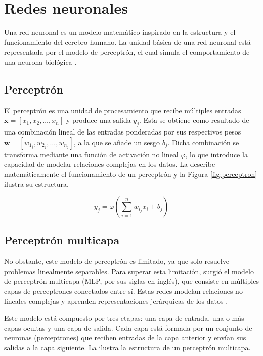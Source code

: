 \section{Redes neuronales}
\label{sec:redes_neuronales}

Una red neuronal es un modelo matemático inspirado en la estructura y el funcionamiento del cerebro humano. La unidad básica de una red neuronal está representada por el modelo de perceptrón, el cual simula el comportamiento de una neurona biológica \cite{rosenblatt1958perceptron}.

\subsection{Perceptrón}
\label{sec:perceptron}

El perceptrón es una unidad de procesamiento que recibe múltiples entradas $\mathbf{x} = [x_1, x_2, \ldots, x_n]$ y produce una salida $y_j$. Esta se obtiene como resultado de una combinación lineal de las entradas ponderadas por sus respectivos pesos $\mathbf{w} = [w_{1_j}, w_{2_j}, \ldots, w_{n_j}]$, a la que se añade un sesgo $b_j$. Dicha combinación se transforma mediante una función de activación no lineal $\varphi$, lo que introduce la capacidad de modelar relaciones complejas en los datos. La  describe matemáticamente el funcionamiento de un perceptrón y la Figura \ref{fig:perceptron} ilustra su estructura.

\begin{equation}
    \label{eq:perceptron}
    y_j = \varphi\left(\sum_{i=1}^{n} w_{i_j} x_i + b_j\right)
\end{equation}



\subsection{Perceptrón multicapa}
\label{sec:perceptron_multicapa}

No obstante, este modelo de perceptrón es limitado, ya que solo resuelve problemas linealmente separables. Para superar esta limitación, surgió el modelo de perceptrón multicapa (MLP, por sus siglas en inglés), que consiste en múltiples capas de perceptrones conectados entre sí. Estas redes modelan relaciones no lineales complejas y aprenden representaciones jerárquicas de los datos \cite{cybenko1989approximation}.

Este modelo está compuesto por tres etapas: una capa de entrada, una o más capas ocultas y una capa de salida. Cada capa está formada por un conjunto de neuronas (perceptrones) que reciben entradas de la capa anterior y envían sus salidas a la capa siguiente. La  ilustra la estructura de un perceptrón multicapa.

